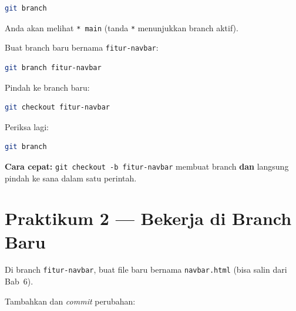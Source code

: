 \begin{lstlisting}[language=bash, caption={Melihat branch}, label={lst:git-branch}]
git branch
\end{lstlisting}

\begin{langkah}
  \item Anda akan melihat \texttt{* main} (tanda \texttt{*} menunjukkan branch aktif).
  \item Buat branch baru bernama \texttt{fitur-navbar}:
\end{langkah}

\begin{lstlisting}[language=bash, caption={Membuat branch baru}, label={lst:git-branch-baru}]
git branch fitur-navbar
\end{lstlisting}

\begin{langkah}
  \item Pindah ke branch baru:
\end{langkah}

\begin{lstlisting}[language=bash, caption={Berpindah ke branch baru}, label={lst:git-checkout}]
git checkout fitur-navbar
\end{lstlisting}

\begin{langkah}
  \item Periksa lagi:
\end{langkah}

\begin{lstlisting}[language=bash, caption={Memeriksa branch aktif}, label={lst:git-branch-check}]
git branch
\end{lstlisting}

\begin{catatan}
\textbf{Cara cepat:} \texttt{git checkout -b fitur-navbar} membuat branch \textbf{dan} langsung pindah ke sana dalam satu perintah.
\end{catatan}

\section{Praktikum 2 --- Bekerja di Branch Baru}
\label{sec:praktik-branch-2}

\begin{langkah}
  \item Di branch \texttt{fitur-navbar}, buat file baru bernama \texttt{navbar.html} (bisa salin dari Bab~6).
  \item Tambahkan dan \emph{commit} perubahan:
\end{langkah}

